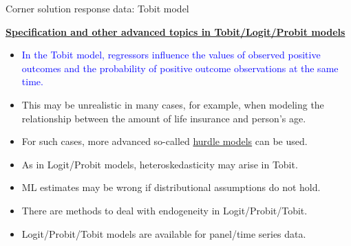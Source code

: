\documentclass[usenames,dvipsnames]{beamer}
\begin{document}
\begin{frame}{Corner solution response data: Tobit model}

{\footnotesize
\underline{\textbf{Specification and other advanced topics in Tobit/Logit/Probit models}} \\
\begin{itemize}
\item \textcolor{Blue}{In the Tobit model, regressors influence the values of observed positive outcomes and the probability of positive outcome observations at the same time.}\\
\medskip
\item This may be unrealistic in many cases, for example, when modeling the relationship between the amount of life insurance and person's age.\\
\medskip
\item For such cases, more advanced so-called \underline{hurdle models} can be used.
\item As in Logit/Probit models, heteroskedasticity may arise in Tobit.\\
\medskip
\item ML estimates may be wrong if distributional assumptions do not hold.\\
\medskip
\item There are methods to deal with endogeneity in Logit/Probit/Tobit.\\
\medskip
\item Logit/Probit/Tobit models are available for panel/time series data.
\end{itemize}}
\end{frame}
\end{document}
